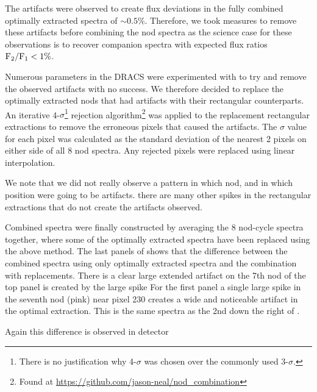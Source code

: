 The artifacts were observed to create flux deviations in the fully combined optimally extracted spectra of \(\sim 0.5\% \). Therefore, we took measures to remove these artifacts before combining the nod spectra as the science case for these observations is to recover companion spectra with expected flux ratios \(\rm {F_2}/{F_1} < 1\% \). 

Numerous parameters in the DRACS were experimented with to try and remove the observed artifacts with no success. We therefore decided to replace the optimally extracted nods that had artifacts with their rectangular counterparts. 
An iterative 4-\(\sigma \)\footnote{There is no justification why 4-\(\sigma\) was chosen over the commonly used 3-\(\sigma\).} rejection algorithm\footnote{Found at \url{https://github.com/jason-neal/nod_combination}} was applied to the replacement rectangular extractions to remove the erroneous pixels that caused the artifacts. The \(\sigma\) value for each pixel was calculated as the standard deviation of the nearest 2 pixels on either side of all 8 nod spectra. Any rejected pixels were replaced using linear interpolation.

We note that we did not really observe a pattern in which nod, and in which position were going to be artifacts. there are many other spikes in the rectangular extractions that do not create the artifacts observed. 

Combined spectra were finally constructed by averaging the 8 nod-cycle spectra together, where some of the optimally extracted spectra have been replaced using the above method. The last panels of  shows that the difference between the combined spectra using only optimally extracted spectra and the combination with replacements.
There is a clear  large extended artifact on the 7th nod of the top panel is created by the large spike For the first panel a single large spike in the seventh nod (pink) near pixel 230 creates a wide and noticeable artifact in the optimal extraction.  This is the same spectra as the 2nd down the right of  .

Again this difference is observed in detector 

